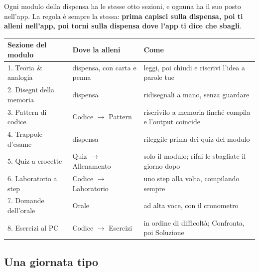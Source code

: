Ogni modulo della dispensa ha le stesse otto sezioni, e ognuna ha il suo posto nell'app.
La regola è sempre la stessa: \textbf{prima capisci sulla dispensa, poi ti alleni
nell'app, poi torni sulla dispensa dove l'app ti dice che sbagli}.

\begin{center}\small
\begin{tabular}{p{4.3cm}p{4.2cm}p{5.6cm}}
\toprule
\textbf{Sezione del modulo} & \textbf{Dove la alleni} & \textbf{Come} \\
\midrule
1. Teoria \& analogia & dispensa, con carta e penna & leggi, poi chiudi e riscrivi l'idea a parole tue \\
2. Disegni della memoria & dispensa & ridisegnali a mano, senza guardare \\
3. Pattern di codice & Codice $\to$ Pattern & riscrivilo a memoria finché compila e l'output coincide \\
4. Trappole d'esame & dispensa & rileggile prima dei quiz del modulo \\
5. Quiz a crocette & Quiz $\to$ Allenamento & solo il modulo; rifai le sbagliate il giorno dopo \\
6. Laboratorio a step & Codice $\to$ Laboratorio & uno step alla volta, compilando sempre \\
7. Domande dell'orale & Orale & ad alta voce, con il cronometro \\
8. Esercizi al PC & Codice $\to$ Esercizi & in ordine di difficoltà; Confronta, poi Soluzione \\
\bottomrule
\end{tabular}
\end{center}

\subsection*{Una giornata tipo}

